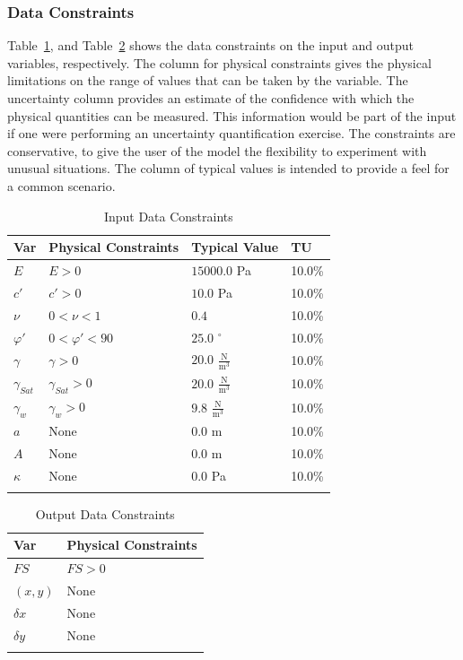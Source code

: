 \documentclass[12pt]{article}
\begin{document}
\subsubsection{Data Constraints}
\label{Sec:DataConstraints}
Table~\ref{Table:InDataConstraints}, and Table~\ref{Table:OutDataConstraints} shows the data constraints on the input and output variables, respectively. The column for physical constraints gives the physical limitations on the range of values that can be taken by the variable. The uncertainty column provides an estimate of the confidence with which the physical quantities can be measured. This information would be part of the input if one were performing an uncertainty quantification exercise. The constraints are conservative, to give the user of the model the flexibility to experiment with unusual situations. The column of typical values is intended to provide a feel for a common scenario.
\begin{longtable}{l l l l}
\toprule
Var & Physical Constraints & Typical Value & TU
\\
\midrule
$E$ & $E>0$ & $15000.0$ Pa & 10.0\%
\\
$c'$ & $c'>0$ & $10.0$ Pa & 10.0\%
\\
$ν$ & $0<ν<1$ & $0.4$ & 10.0\%
\\
$φ'$ & $0<φ'<90$ & $25.0$ ${}^{\circ}$ & 10.0\%
\\
$γ$ & $γ>0$ & $20.0$ $\frac{\text{N}}{\text{m}^{3}}$ & 10.0\%
\\
${γ_{Sat}}$ & ${γ_{Sat}}>0$ & $20.0$ $\frac{\text{N}}{\text{m}^{3}}$ & 10.0\%
\\
${γ_{w}}$ & ${γ_{w}}>0$ & $9.8$ $\frac{\text{N}}{\text{m}^{3}}$ & 10.0\%
\\
$a$ & None & $0.0$ m & 10.0\%
\\
$A$ & None & $0.0$ m & 10.0\%
\\
$κ$ & None & $0.0$ Pa & 10.0\%
\\
\bottomrule
\caption{Input Data Constraints}
\label{Table:InDataConstraints}
\end{longtable}
\begin{longtable}{l l}
\toprule
Var & Physical Constraints
\\
\midrule
$FS$ & $FS>0$
\\
$(x,y)$ & None
\\
$δx$ & None
\\
$δy$ & None
\\
\bottomrule
\caption{Output Data Constraints}
\label{Table:OutDataConstraints}
\end{longtable}
\end{document}
